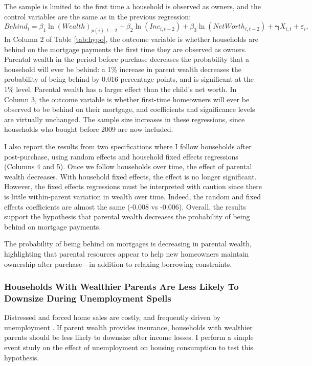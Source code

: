 \documentclass[12pt]{article}
\begin{document}
The sample is limited to the first time a household is observed as owners, and the control variables are the same as in the previous regression:
\begin{equation*}
Behind_i = \beta_1 \ln(Wealth)_{p(i),t-2}  + \beta_2 \ln(Inc_{i,t-2}) + \beta_3 \ln(NetWorth_{i,t-2}) + \mathbf{\gamma}{X_{i,t}} + \varepsilon_{i},
\end{equation*}
In Column 2 of Table \ref{tab:hypo}, the outcome variable is whether households are behind on the mortgage payments the first time they are observed as owners. Parental wealth in the period before purchase decreases the probability that a household will ever be behind: a 1\% increase in parent wealth decreases the probability of being behind by 0.016 percentage points, and is significant at the 1\% level.  Parental wealth has a larger effect than the child's net worth. In Column 3, the outcome variable is whether first-time homeowners will ever be observed to be behind on their mortgage, and coefficients and significance levels are virtually unchanged. The sample size increases in these regressions, since households who bought before 2009 are now included.

I also report the results from two specifications where I follow households after post-purchase, using random effects and household fixed effects regressions (Columns 4 and 5). Once we follow households over time, the effect of parental wealth decreases. With household fixed effects, the effect is no longer significant. However, the fixed effects regressions must be interpreted with caution since there is little within-parent variation in wealth over time. Indeed, the random and fixed effects coefficients are almost the same (-0.008 vs -0.006). Overall, the results support the hypothesis that parental wealth decreases the probability of being behind on mortgage payments.

The probability of being behind on mortgages is decreasing in parental wealth, highlighting that parental resources appear to help new homeowners maintain ownership after purchase---in addition to relaxing borrowing constraints.

\subsubsection{Households With Wealthier Parents Are Less Likely To Downsize During Unemployment Spells}\label{sec:eventstudy}
Distressed and forced home sales are costly, and frequently driven by unemployment \citep{kermani2021racial,hsu2018unemployment}. If parent wealth provides insurance, households with wealthier parents should be less likely to downsize after income losses. I perform a simple event study on the effect of unemployment on housing consumption to test this hypothesis.
\end{document}
